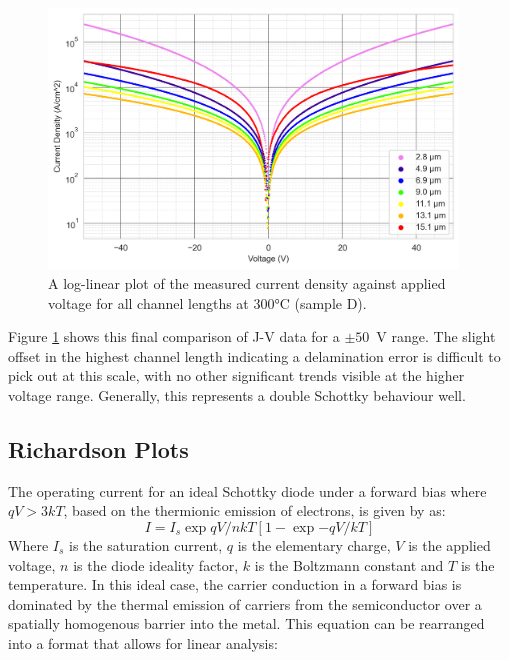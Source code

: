 \begin{refsection}
\begin{figure}[H]
    \centering
    \includegraphics[width=0.97\textwidth]{Sample D 2019/50V_Current_Density_vs_Voltage_Temperature_300_log.png}
    \caption{A log-linear plot of the measured current density against applied voltage for all channel lengths at 300\si{\degreeCelsius} (sample D).}
    \label{fig:50V_current_density_300_D}
\end{figure}

Figure \ref{fig:50V_current_density_300_D} shows this final comparison of J-V data for a $\pm50$~\si{\volt} range. The slight offset in the highest channel length indicating a delamination error is difficult to pick out at this scale, with no other significant trends visible at the higher voltage range. Generally, this represents a double Schottky behaviour well.

\subsection{Richardson Plots}
The operating current for an ideal Schottky diode under a forward bias where $qV > 3kT$, based on the thermionic emission of electrons, is given by \cite{sze2006} as:
\begin{equation}
    I=I_{s}\exp{qV/nkT}\left[1-\exp{-qV/kT}\right]
\end{equation}
Where $I_{s}$ is the saturation current, $q$ is the elementary charge, $V$ is the applied voltage, $n$ is the diode ideality factor, $k$ is the Boltzmann constant and $T$ is the temperature. In this ideal case, the carrier conduction in a forward bias is dominated by the thermal emission of carriers from the semiconductor over a spatially homogenous barrier into the metal. This equation can be rearranged into a format that allows for linear analysis:


\end{refsection}
